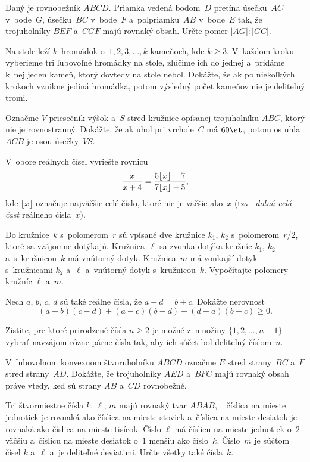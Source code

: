 {%
Daný je rovnobežník $ABCD$. Priamka vedená bodom~$D$ pretína úsečku~$AC$
v~bode~$G$, úsečku~$BC$ v~bode~$F$ a~polpriamku~$AB$ v~bode~$E$
tak, že trojuholníky $BEF$ a~$CGF$ majú rovnaký obsah. Určte pomer
$|AG|:|GC|$.}

{%
Na stole leží $k$~hromádok o~$1, 2, 3, \dots, k$ kameňoch, kde
$k\ge3$. V~každom kroku vyberieme tri ľubovoľné hromádky na stole,
zlúčime ich do jednej a~pridáme k~nej jeden kameň, ktorý dovtedy na stole
nebol. Dokážte, že ak po niekoľkých krokoch vznikne jediná
hromádka, potom výsledný počet kameňov nie je deliteľný tromi.}

{%
Označme $V$ priesečník výšok a~$S$ stred kružnice opísanej  trojuholníku
$ABC$, ktorý nie je rovnostranný. Dokážte, že ak uhol pri vrchole~$C$
má $60\st$, potom os uhla $ACB$ je osou úsečky~$V\!S$.}

{%
V~obore reálnych čísel vyriešte rovnicu
$$
{x\over x+4}={5\lfloor x \rfloor-7\over7\lfloor x\rfloor-5},
$$
kde $\lfloor x \rfloor$ označuje najväčšie celé číslo, ktoré nie je väčšie ako~$x$
(tzv.~{\it dolná celá časť\/} reálneho čísla~$x$).}

{%
Do kružnice~$k$ s~polomerom~$r$ sú vpísané dve kružnice $k_1$,
$k_2$ s~polomerom~$r/2$, ktoré sa vzájomne dotýkajú. Kružnica~$\ell$
sa zvonka dotýka kružníc $k_1$, $k_2$ a~s~kružnicou~$k$ má
vnútorný dotyk. Kružnica~$m$ má vonkajší dotyk s~kružnicami $k_2$
a~$\ell$ a~vnútorný dotyk s~kružnicou~$k$. Vypočítajte polomery kružníc
$\ell$ a~$m$.}

{%
Nech $a$, $b$, $c$, $d$ sú také reálne čísla, že $a+d=b+c$.
Dokážte nerovnosť
$$
(a-b)(c-d)+(a-c)(b-d)+(d-a)(b-c)\ge0.
$$}

{%
Zistite, pre ktoré prirodzené čísla $n\ge2$ je možné z~množiny
$\{1,2,\dots,n-1\}$ vybrať navzájom rôzne párne čísla
tak, aby ich súčet bol deliteľný číslom~$n$.}

{%
V~ľubovoľnom konvexnom štvoruholníku $ABCD$ označme $E$ stred
strany~$BC$ a~$F$ stred strany~$AD$. Dokážte, že trojuholníky $AED$
a~$BFC$ majú rovnaký obsah práve vtedy, keď sú strany $AB$ a~$CD$
rovnobežné.}

{%
Tri štvormiestne čísla $k$, $\ell$, $m$ majú rovnaký tvar $ABAB$,
\tj.~číslica na mieste jednotiek je rovnaká ako číslica na mieste
stoviek a~číslica na mieste desiatok je rovnaká ako číslica na mieste
tisícok. Číslo $\ell$ má číslicu na mieste jednotiek o~$2$ väčšiu
a~číslicu na mieste desiatok o~$1$ menšiu ako číslo~$k$. Číslo~$m$ je
súčtom čísel $k$ a~$\ell$ a~je deliteľné deviatimi. Určte všetky
také čísla~$k$.}

